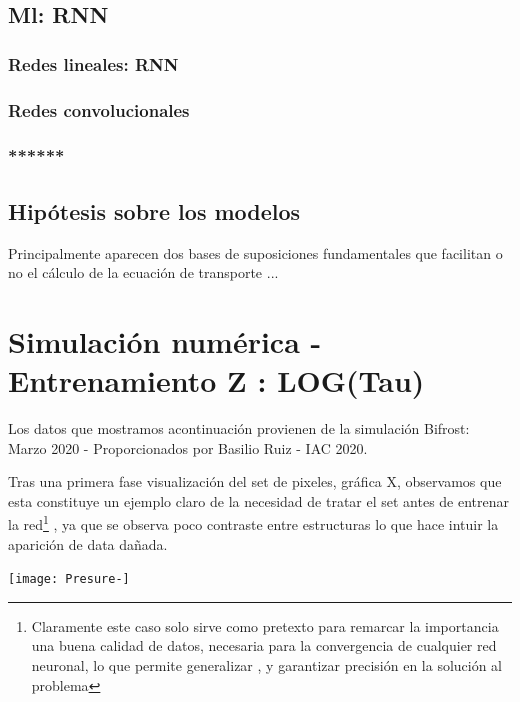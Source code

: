 \documentclass[8pt]{article}
\begin{document}
		\subsection{Ml: RNN}
		
			\subsubsection{Redes lineales: RNN}
			
			\subsubsection{Redes convolucionales}
			
			\subsubsection{******}
			
		\subsection{Hipótesis sobre los modelos}
		
		Principalmente aparecen dos bases de suposiciones fundamentales que facilitan o no el cálculo de la ecuación de transporte ...
	
	
		\section{Simulación numérica - Entrenamiento Z : LOG(Tau)}
		
		
		
		
		Los datos que mostramos acontinuación provienen de la simulación Bifrost: Marzo 2020 - Proporcionados por Basilio Ruiz - IAC 2020.\newline
		
		Tras una primera fase visualización del set de pixeles, gráfica X, observamos que esta constituye un ejemplo claro de la necesidad de tratar el set antes de entrenar la red\footnote{Claramente este caso solo sirve como pretexto para remarcar la importancia  una buena calidad de datos, necesaria para la convergencia de cualquier red neuronal, lo que permite generalizar , y garantizar precisión en la solución al problema} , ya que se observa poco contraste entre estructuras lo que hace intuir la aparición de data dañada.\newline
		
				\center \texttt{[image: Presure-]}
		
\end{document}

